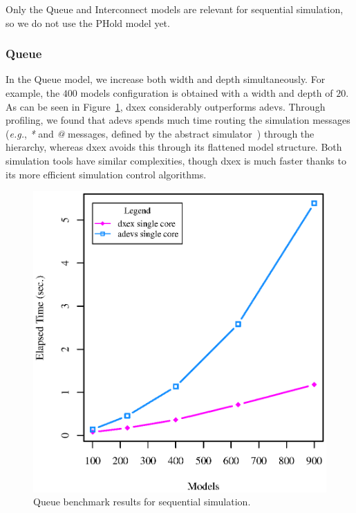 Only the Queue and Interconnect models are relevant for sequential simulation, so we do not use the PHold model yet.

\subsubsection{Queue}
In the Queue model, we increase both width and depth simultaneously.
For example, the $400$ models configuration is obtained with a width and depth of $20$.
As can be seen in Figure~\ref{fig:Queue_benchmark}, dxex considerably outperforms adevs.
Through profiling, we found that adevs spends much time routing the simulation messages (\textit{e.g.}, \textit{*} and \textit{@} messages, defined by the abstract simulator~\cite{AbstractSimulator}) through the hierarchy, whereas dxex avoids this through its flattened model structure.
Both simulation tools have similar complexities, though dxex is much faster thanks to its more efficient simulation control algorithms.

\begin{figure}
    \center
	\includegraphics[width=\plotfraction\columnwidth]{fig/queue_sequential.eps}
	\caption{Queue benchmark results for sequential simulation.}
	\label{fig:Queue_benchmark}
\end{figure}

